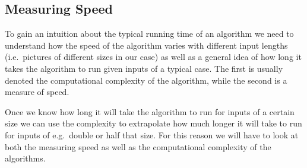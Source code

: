 \subsection{Measuring Speed}
%
To gain an intuition about the typical running time of an algorithm we 
need to understand how the speed of the algorithm varies with different 
input lengths (i.e.\ pictures of different sizes in our case) as well as 
a general idea of how long it takes the algorithm to run given inputs of
a typical case. The first is usually denoted the computational 
complexity of the algorithm, while the second is a measure of speed.

Once we know how long it will take the algorithm to run for inputs of a 
certain size we can use the complexity to extrapolate how much longer it
will take to run for inputs of e.g.\ double or half that size. For this 
reason we will have to look at both the measuring speed as well
as the computational complexity of the algorithms.
%
